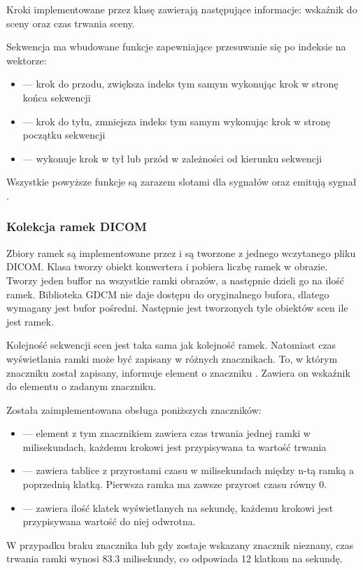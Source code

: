 \par
Kroki implementowane przez klasę  zawierają następujące informacje: wskaźnik do sceny oraz czas trwania sceny.

\par
Sekwencja ma wbudowane funkcje zapewniające przesuwanie się po indeksie na wektorze:
\begin{itemize}
    \item {} --- krok do przodu, zwiększa indeks tym samym wykonując krok w stronę końca sekwencji
    \item {} --- krok do tyłu, zmniejsza indeks tym samym wykonując krok w stronę początku sekwencji
    \item {} --- wykonuje krok w tył lub przód w zależności od kierunku sekwencji
\end{itemize}
Wszystkie powyższe funkcje są zarazem slotami dla sygnałów oraz emitują sygnał .

\subsubsection{Kolekcja ramek DICOM}
\label{sec:sokar-dicomframeset}

\par
Zbiory ramek są implementowane przez  i są tworzone z jednego wczytanego pliku DICOM.
Klasa tworzy obiekt konwertera i pobiera liczbę ramek w obrazie.
Tworzy jeden buffor na wszystkie ramki obrazów, a następnie dzieli go na ilość ramek.
Biblioteka GDCM nie daje dostępu do oryginalnego bufora, dlatego wymagany jest bufor pośredni.
Następnie jest tworzonych tyle obiektów scen ile jest ramek.
\par
Kolejność sekwencji scen jest taka sama jak kolejność ramek.
Natomiast czas wyświetlania ramki może być zapisany w różnych znacznikach.
To, w którym znaczniku został zapisany, informuje element o znaczniku .
Zawiera on wskaźnik do elementu o zadanym znaczniku.
\par
Została zaimplementowana obsługa poniższych znaczników:
\begin{itemize}
    \item {} --- element z tym znacznikiem zawiera czas trwania jednej ramki w milisekundach, każdemu krokowi jest przypisywana ta wartość trwania

    \item {} --- zawiera tablice z przyrostami czasu w milisekundach między n-tą ramką a poprzednią klatką. Pierwsza ramka ma zawsze przyrost czasu równy 0.
    
    \item {} --- zawiera ilość klatek wyświetlanych na sekundę, każdemu krokowi jest przypisywana wartość do niej odwrotna.
\end{itemize}
W przypadku braku znacznika lub gdy zostaje wskazany znacznik nieznany, czas trwania ramki wynosi $83.3$ milisekundy, co odpowiada 12 klatkom na sekundę.


